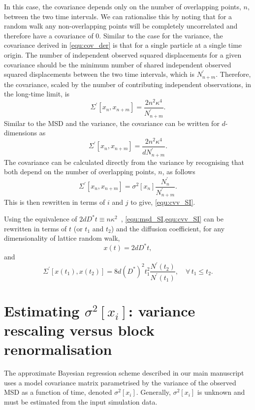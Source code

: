 \documentclass[reprint,superscriptaddress,nobibnotes,amsmath,amssymb,aps,prx,hidelinks]{revtex4-2}
\newcommand{\oMSDs}[1]{\ensuremath{x}(#1)}
\newcommand{\oMSDi}{\ensuremath{x_i}}
\newcommand{\oMSDn}{\ensuremath{x_n}}
\newcommand{\oMSDm}{\ensuremath{x_{n + m}}}
\newcommand{\nind}[1]{\ensuremath{N^\prime_{#1}}}
\newcommand{\D}{\ensuremath{D^*}}
\newcommand{\var}[1]{\ensuremath{\sigma^2[#1]}}
\begin{document}
In this case, the covariance depends only on the number of overlapping points, $n$, between the two time intervals. 
We can rationalise this by noting that for a random walk any non-overlapping points will be completely uncorrelated and therefore have a covariance of \num{0}. 
Similar to the case for the variance, the covariance derived in \cref{equ:cov_der} is that for a single particle at a single time origin. 
The number of independent observed squared displacements for a given covariance should be the minimum number of shared independent observed squared displacements between the two time intervals, which is $\nind{n+m}$. 
Therefore, the covariance, scaled by the number of contributing independent observations, in the long-time limit, is
\begin{equation}
    \Sigma^\prime \left[\oMSDn, \oMSDm \right] = \frac{2n^2\kappa^4}{\nind{n+m}}.
\end{equation}
Similar to the MSD and the variance, the covariance can be written for $d$-dimensions as 
\begin{equation}
    \Sigma^\prime \left[\oMSDn, \oMSDm \right] = \frac{2n^2\kappa^4}{d\nind{n+m}}.
\end{equation}
The covariance can be calculated directly from the variance by recognising that both depend on the number of overlapping points, $n$, as follows
\begin{equation}
    \Sigma^\prime \left[\oMSDn, \oMSDm \right] = \var{\oMSDn}\frac{\nind{n}}{\nind{n+m}}.
\end{equation}
This is then rewritten in terms of $i$ and $j$ to give, \cref{equ:cvv_SI}.

Using the equivalence of $2d\D t \equiv n\kappa^2$~\cite{howard_reports_1964}, \cref{equ:msd_SI,equ:cvv_SI} can be rewritten in terms of $t$ (or $t_1$ and $t_2$) and the diffusion coefficient, for any dimensionality of lattice random walk,
\begin{equation}
    \oMSDs{t} = 2d \D t,
    \label{equ:der_msd_fick}
\end{equation}
and 
\begin{equation}
    \Sigma^\prime \left[\oMSDs{t_1}, \oMSDs{t_2} \right] = 8d{(\D)}^2 t_1^2\frac{N^\prime(t_2)}{N^\prime(t_1)},\hspace{1em} \forall\,t_1 \leq t_2.
\end{equation}

\section{Estimating $\var{\oMSDi}$: variance rescaling versus block renormalisation}
\label{sec:var_est}
The approximate Bayesian regression scheme described in our main manuscript uses a model covariance matrix parametrised by the variance of the observed MSD as a function of time, denoted $\var{\oMSDi}$. 
Generally, $\var{\oMSDi}$ is unknown and must be estimated from the input simulation data.
\end{document}
